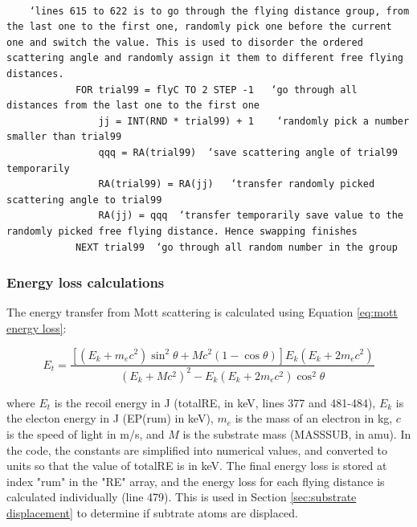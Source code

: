 \documentclass[10pt, reqno]{exam}
\begin{document}
\begin{verbatim}
    
    ‘lines 615 to 622 is to go through the flying distance group, from the last one to the first one, randomly pick one before the current one and switch the value. This is used to disorder the ordered scattering angle and randomly assign it them to different free flying distances. 
            FOR trial99 = flyC TO 2 STEP -1   ‘go through all distances from the last one to the first one
                jj = INT(RND * trial99) + 1    ‘randomly pick a number smaller than trial99
                qqq = RA(trial99)  ‘save scattering angle of trial99 temporarily 
                RA(trial99) = RA(jj)   ‘transfer randomly picked scattering angle to trial99
                RA(jj) = qqq  ‘transfer temporarily save value to the randomly picked free flying distance. Hence swapping finishes
            NEXT trial99  ‘go through all random number in the group
\end{verbatim}

\subsubsection{Energy loss calculations}

The energy transfer from Mott scattering is calculated using Equation \ref{eq:mott energy loss}: \par

\begin{equation}
    E_t = \frac{[(E_k + m_ec^2) \sin^2\theta + Mc^2 (1 - \cos\theta)]E_k(E_k + 2m_ec^2)}{(E_k + Mc^2)^2 - E_k(E_k + 2m_ec^2)\cos^2\theta}
    \label{eq:mott energy loss}
\end{equation}

where $E_t$ is the recoil energy in J (totalRE, in keV, lines 377 and 481-484), $E_k$ is the electon energy in J (EP(rum) in keV), $m_e$ is the mass of an electron in kg, $c$ is the speed of light in \si{m/s}, and $M$ is the substrate mass (MASSSUB, in amu). In the code, the constants are simplified into numerical values, and converted to units so that the value of totalRE is in keV. The final energy loss is stored at index "rum" in the "RE" array, and the energy loss for  each flying distance is calculated individually (line 479). This is used in Section \ref{sec:substrate displacement} to determine if subtrate atoms are displaced. \par
\end{document}
